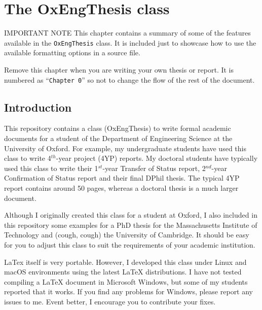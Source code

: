 \setcounter{chapter}{-1}
\chapter{The OxEngThesis \latex class}



\begin{OxWarningBox}{IMPORTANT NOTE}
This chapter contains a summary of some of the features available in the \verb|OxEngThesis| class. It is included just to showcase how to use the available formatting options in a \latex source file.

Remove this chapter when you are writing your own thesis or report. It is numbered as ``\verb|Chapter 0|'' so not to change the flow of the rest of the document.
\end{OxWarningBox}


\section{Introduction}


This repository contains a \latex class (OxEngThesis) to write formal academic documents for a student of the Department of Engineering Science at the University of Oxford. For example, my undergraduate students have used this class to write 4$^{th}$-year project (4YP) reports. My doctoral students have typically used this class to write their 1$^{st}$-year Transfer of Status report, 2$^{nd}$-year Confirmation of Status report and their final DPhil thesis. The typical 4YP report contains around 50 pages, whereas a doctoral thesis is a much larger document.

Although I originally created this class for a student at Oxford, I also included in this repository some examples for a PhD thesis for the Massachusetts Institute of Technology and (cough, cough) the University of Cambridge. It should be easy for you to adjust this class to suit the requirements of your academic institution.

LaTex itself is very portable. However, I developed this class under Linux and macOS environments using the latest LaTeX distributions. I have not tested compiling a LaTeX document in Microsoft Windows, but some of my students reported that it works. If you find any problems for Windows, please report any issues to me. Event better, I encourage you to contribute your fixes.


